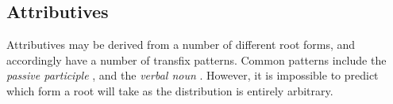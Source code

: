 \documentclass[grammar]{subfiles}
\begin{document}

%

  \subsection{Attributives}
  \label{ssec:am_attributives}

  Attributives may be derived from a number of different root forms, and accordingly have a number of transfix patterns. 
  Common patterns include the \emph{passive participle} , and the \emph{verbal noun} . 
  However, it is impossible to predict which form a root will take as the distribution is entirely arbitrary.

%
%
\end{document}

